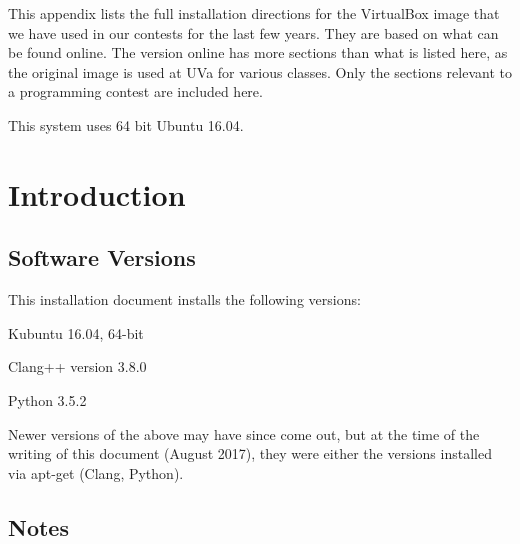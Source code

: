 This appendix lists the full installation directions for the
VirtualBox image that we have used in our contests for the last few
years.  They are based on what can be found
online.
The version online has more sections than what is listed here, as the
original image is used at UVa for various classes.  Only the sections
relevant to a programming contest are included here.

This system uses 64 bit Ubuntu 16.04.


\section{Introduction}

\subsection*{Software Versions}

This installation document installs the following versions:

\begin{itemlist}
\item Kubuntu 16.04, 64-bit
\item Clang++ version 3.8.0
\item Python 3.5.2
\end{itemlist}

Newer versions of the above may have since come out, but at the time
of the writing of this document (August 2017), they were either the
versions installed via apt-get (Clang, Python).

\subsection*{Notes}


